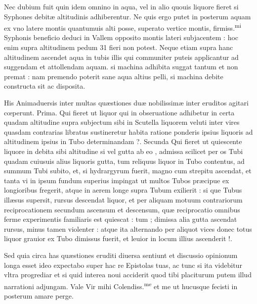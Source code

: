 \documentclass[11pt,a4paper]{article}
\begin{document}
Nec dubium fuit quin idem omnino in aqua, vel in alio quouis liquore fieret si Syphones debitæ altitudinis adhiberentur. Ne quis ergo putet in posterum aquam ex vno latere montis quantumuis alti posse, superato vertice montis, firmiss.\textsuperscript{mi} Syphonis beneficio deduci in Vallem opposito montis lateri subjacentem : hoc enim supra altitudinem \struck{\ill{}} pedum 31 fieri non potest. Neque etiam supra hanc altitudinem ascendet aqua in tubis illis qui communiter puteis applicantur ad suggendam et attollendam aquam. si machina adhibita suggat tantum et non premat : nam premendo poterit sane aqua altius pelli, si machina debite constructa sit ac disposita.

His Animaduersis inter multas quæstiones duæ nobilissimæ inter eruditos agitari cœperunt. Prima. Qui fieret ut liquor qui in obseruatione adhibetur in certa quadam altitudine supra subjectum sibi in Scutella liquorem veluti inter vires quasdam contrarias libratus sustineretur habita ratione ponderis ipsius liquoris ad altitudinem ipsius in Tubo determinandam ?. Secunda Qui fieret ut quiescente liquore in debita sibi altitudine si vel gutta ab eo  , admissa scilicet per os Tubi quadam cuiusuis alius liquoris gutta, tum reliquus liquor in Tubo contentus, ad summum Tubi subito, et, si hydrargyrum fuerit, magno cum strepitu ascendat, et tanta vi in ipsum fundum superius impingat ut multos Tubos præcipue ex longioribus fregerit, atque in aerem longe supra Tubum exilierit : si que Tubus illæsus supersit, rursus descendat liquor, et per aliquam motuum contrariorum reciprocationem secundum ascensum et descensum, quæ reciprocatio omnibus ferme experimentis familiaris est quiescat : tum ; dimissa alia gutta ascendat rursus, minus tamen violenter : atque ita alternando per aliquot vices donec totus liquor grauior ex Tubo dimissus fuerit, et leuior in locum illius ascenderit !.

Sed quia circa has quæstiones eruditi diuersa sentiunt et discussio opinionum longa esset ideo expectabo super hac re Epistolas tuas, ac tunc si ita videbitur vltra progrediar et si quid interea noui acciderit quod tibi placiturum putem illud narrationi adjungam. Vale Vir mihi Colendiss.\textsuperscript{me} et me ut hucusque fecisti in posterum amare perge.
\end{document}
